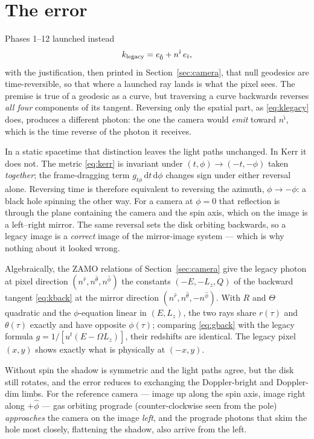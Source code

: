 \section{The error}
\label{sec:hand-error}

Phases 1--12 launched instead
\begin{equation}
k_{\rm legacy} = e_{\hat 0} + n^{\hat\imath}\, e_{\hat\imath},
\label{eq:klegacy}
\end{equation}
with the justification, then printed in Section~\ref{sec:camera}, that
null geodesics are time-reversible, so that where a launched ray lands
is what the pixel sees. The premise is true of a geodesic as a curve,
but traversing a curve backwards reverses \emph{all four} components of
its tangent. Reversing only the spatial part, as \eqref{eq:klegacy}
does, produces a different photon: the one the camera would
\emph{emit} toward $n^{\hat\imath}$, which is the time reverse of the
photon it receives.

In a static spacetime that distinction leaves the light paths
unchanged. In Kerr it does not. The metric \eqref{eq:kerr} is invariant
under $(t, \phi) \to (-t, -\phi)$ taken \emph{together}; the
frame-dragging term $g_{t\phi}\,\mathrm{d}t\,\mathrm{d}\phi$ changes sign
under either reversal alone. Reversing time is therefore equivalent to
reversing the azimuth, $\phi \to -\phi$: a black hole spinning the other
way. For a camera at $\phi = 0$ that reflection is through the plane
containing the camera and the spin axis, which on the image is a
left--right mirror. The same reversal sets the disk orbiting backwards,
so a legacy image is a \emph{correct} image of the mirror-image system —
which is why nothing about it looked wrong.

Algebraically, the ZAMO relations of Section~\ref{sec:camera} give the
legacy photon at pixel direction $(n^{\hat r}, n^{\hat\theta},
n^{\hat\phi})$ the constants $(-E, -L_z, Q)$ of the backward tangent
\eqref{eq:kback} at the mirror direction $(n^{\hat r}, n^{\hat\theta},
-n^{\hat\phi})$. With $R$ and $\Theta$ quadratic and the $\phi$-equation
linear in $(E, L_z)$, the two rays share $r(\tau)$ and $\theta(\tau)$
exactly and have opposite $\phi(\tau)$; comparing \eqref{eq:gback} with
the legacy formula $g = 1/[u^t(E - \Omega L_z)]$, their redshifts are
identical. The legacy pixel $(x, y)$ shows exactly what is physically
at $(-x, y)$.

Without spin the shadow is symmetric and the light paths agree, but
the disk still rotates, and the error reduces to exchanging the
Doppler-bright and Doppler-dim limbs. For the reference camera — image
up along the spin axis, image right along $+\hat\phi$ — gas orbiting
prograde (counter-clockwise seen from the pole) \emph{approaches} the
camera on the image \emph{left}, and the prograde photons that skim the
hole most closely, flattening the shadow, also arrive from the left.

